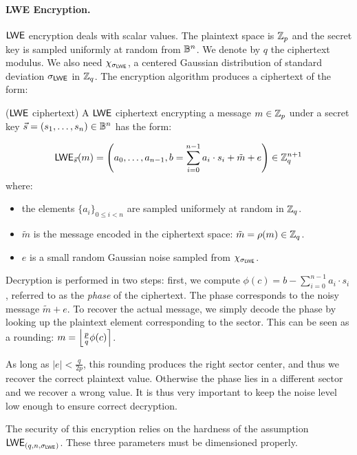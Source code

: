 \paragraph{LWE Encryption.}
$\textsf{LWE}$ encryption deals with scalar values. The plaintext space is $\mathbb{Z}_p$ and the secret key is sampled uniformly at random from $\mathbb{B}^n$. We denote by $q$ the ciphertext modulus. We also need 
$\chi_{\sigma_{\textsf{LWE}}}$, a centered Gaussian distribution of standard deviation $\sigma_{\textsf{LWE}}$ in $\mathbb{Z}_q$. The encryption algorithm produces a ciphertext of the form:

\begin{definition}($\textsf{LWE}$ ciphertext)
	A $\textsf{LWE}$ ciphertext encrypting a message $m \in \mathbb{Z}_p$ under a secret key $\vec s=(s_1, \dots, s_n) \in \mathbb{B}^n$ has the form:
	
	\begin{equation}
		\textsf{LWE}_{\vec s}(m) = \left (a_0, \dots, a_{n-1}, b = \sum_{i=0}^{n-1} a_i \cdot s_i + \tilde m + e \right ) \in \mathbb{Z}_q^{n+1}
	\end{equation}
	where:
	\begin{itemize}
		\item the elements $\{a_i\}_{0 \le i < n}$ are sampled uniformely at random in $\mathbb{Z}_q$.
		\item $\tilde m$ is the message encoded in the ciphertext space: $\tilde m = \rho(m) \in \mathbb{Z}_q$.
		\item $e$ is a small random Gaussian noise sampled from $\chi_{\sigma_{\textsf{LWE}}}$.
	\end{itemize}
\end{definition}




Decryption is performed in two steps: first, we compute $\phi(c) = b - \sum_{i=0}^{n - 1} a_i \cdot s_i$, referred to as the \emph{phase} of the ciphertext. The phase corresponds to the noisy message $\tilde{m} + e$. To recover the actual message, we simply decode the phase by looking up the plaintext element corresponding to the sector. This can be seen as a rounding: $m = \left \lfloor \frac p q \phi(c) \right \rceil$. 

As long as $|e| < \frac{q}{2p}$, this rounding produces the right sector center, and thus we recover the correct plaintext value. Otherwise the phase lies in a different sector and we recover a wrong value. It is thus very important to keep the noise level low enough to ensure correct decryption.


The security of this encryption relies on the hardness of the assumption $\textsf{LWE}_{(q, n, \sigma_{\textsf{LWE}})}$. These three parameters must be dimensioned properly.



